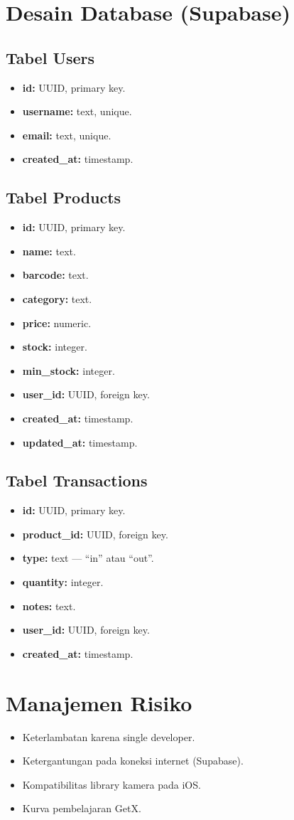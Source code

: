 \documentclass[a4paper,12pt]{article}
\begin{document}
\section{Desain Database (Supabase)}
\subsection{Tabel Users}
\begin{itemize}[leftmargin=1.5cm]
    \item \textbf{id:} UUID, primary key.
    \item \textbf{username:} text, unique.
    \item \textbf{email:} text, unique.
    \item \textbf{created\_at:} timestamp.
\end{itemize}

\subsection{Tabel Products}
\begin{itemize}[leftmargin=1.5cm]
    \item \textbf{id:} UUID, primary key.
    \item \textbf{name:} text.
    \item \textbf{barcode:} text.
    \item \textbf{category:} text.
    \item \textbf{price:} numeric.
    \item \textbf{stock:} integer.
    \item \textbf{min\_stock:} integer.
    \item \textbf{user\_id:} UUID, foreign key.
    \item \textbf{created\_at:} timestamp.
    \item \textbf{updated\_at:} timestamp.
\end{itemize}

\subsection{Tabel Transactions}
\begin{itemize}[leftmargin=1.5cm]
    \item \textbf{id:} UUID, primary key.
    \item \textbf{product\_id:} UUID, foreign key.
    \item \textbf{type:} text --- ``in'' atau ``out''.
    \item \textbf{quantity:} integer.
    \item \textbf{notes:} text.
    \item \textbf{user\_id:} UUID, foreign key.
    \item \textbf{created\_at:} timestamp.
\end{itemize}

\section{Manajemen Risiko}
\begin{itemize}[leftmargin=1.5cm]
    \item Keterlambatan karena single developer.
    \item Ketergantungan pada koneksi internet (Supabase).
    \item Kompatibilitas library kamera pada iOS.
    \item Kurva pembelajaran GetX.
\end{itemize}
\end{document}
